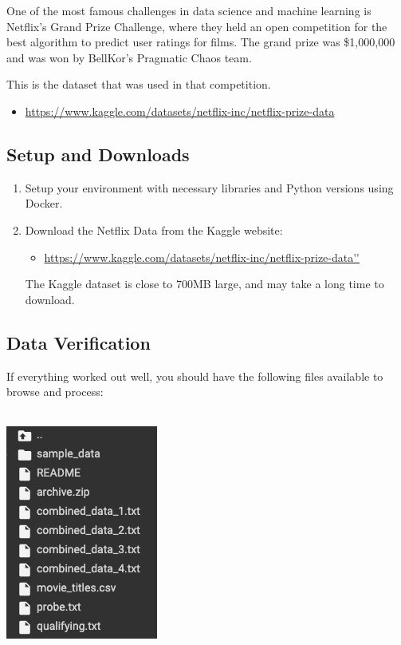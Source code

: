 \documentclass{cs6220-assignment}
\begin{document}
One of the most famous challenges in data science and machine learning is Netflix's Grand Prize Challenge, where they held an open competition for the best algorithm to predict user ratings for films. The grand prize was \$1,000,000 and was won by BellKor's Pragmatic Chaos team. 

This is the dataset that was used in that competition.
\begin{itemize}
    \item \url{https://www.kaggle.com/datasets/netflix-inc/netflix-prize-data}
\end{itemize}

\subsection{Setup and Downloads}

\begin{enumerate}
	\item Setup your environment with necessary libraries and Python versions using Docker.
        \item Download the Netflix Data from the Kaggle website:
        \begin{itemize}
            \item \url{https://www.kaggle.com/datasets/netflix-inc/netflix-prize-data''}
        \end{itemize}
	The Kaggle dataset is close to 700MB large, and may take a long time to download.
\end{enumerate}

\subsection{Data Verification}

If everything worked out well, you should have the following files available to browse and process:

\\
\includegraphics{images/hw1q2.png} \\
\end{document}
